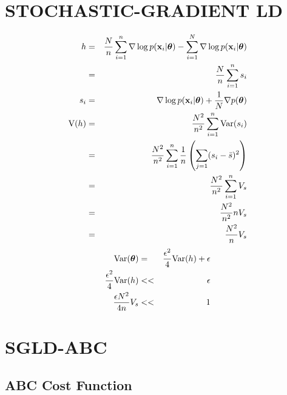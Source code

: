 \documentclass[]{article}
\begin{document}
\section{STOCHASTIC-GRADIENT LD} \label{sgld}
\begin{eqnarray}
  h & = & \frac{N}{n} \sum_{i=1}^n \nabla \log p({\bf x}_i | {\bm \theta})- \sum_{i=1}^N \nabla \log p({\bf x}_i | {\bm \theta} ) \\
    & = & \frac{N}{n} \sum_{i=1}^n s_i \\
  s_i & = & \nabla \log p({\bf x}_i | {\bm \theta}) + \frac{1}{N} \nabla p({\bm \theta}) \\
  \text{V}(h) & = & \frac{N^2}{n^2} \sum_{i=1}^n \text{Var}(s_i) \\
                & = & \frac{N^2}{n^2} \sum_{i=1}^n \frac{1}{n} \left( \sum_{j=1} (s_i - \bar{s})^2 \right) \\
                & = & \frac{N^2}{n^2} \sum_{i=1}^n V_s \\
                & = & \frac{N^2}{n^2} n V_s \\
                & = & \frac{N^2}{n} V_s 
\end{eqnarray}
\begin{eqnarray}
  \text{Var}({\bm \theta}) & = & \frac{\epsilon^2}{4}\text{Var}(h) + \epsilon \\
         \frac{\epsilon^2}{4}\text{Var}(h) & << & \epsilon \\
         \frac{\epsilon N^2}{4 n} V_s & << & 1       
\end{eqnarray}


\section{SGLD-ABC} \label{sgld}

\subsection{ABC Cost Function}
\end{document}
